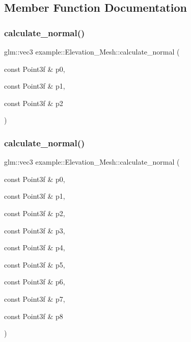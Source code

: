 \subsection{Member Function Documentation}
\mbox{\label{classexample_1_1_elevation___mesh_a3a4637a65ae4c1a7d0f051d26b1f78d8}} 
\subsubsection{\texorpdfstring{calculate\+\_\+normal()}{calculate\_normal()}\hspace{0.1cm}{\footnotesize\ttfamily [1/2]}}
{\footnotesize\ttfamily glm\+::vec3 example\+::\+Elevation\+\_\+\+Mesh\+::calculate\+\_\+normal (\begin{DoxyParamCaption}\item[{const Point3f \&}]{p0,  }\item[{const Point3f \&}]{p1,  }\item[{const Point3f \&}]{p2 }\end{DoxyParamCaption})}

\mbox{\label{classexample_1_1_elevation___mesh_aee6583fd55f431f0a6b8dc8e99b6db94}} 
\subsubsection{\texorpdfstring{calculate\+\_\+normal()}{calculate\_normal()}\hspace{0.1cm}{\footnotesize\ttfamily [2/2]}}
{\footnotesize\ttfamily glm\+::vec3 example\+::\+Elevation\+\_\+\+Mesh\+::calculate\+\_\+normal (\begin{DoxyParamCaption}\item[{const Point3f \&}]{p0,  }\item[{const Point3f \&}]{p1,  }\item[{const Point3f \&}]{p2,  }\item[{const Point3f \&}]{p3,  }\item[{const Point3f \&}]{p4,  }\item[{const Point3f \&}]{p5,  }\item[{const Point3f \&}]{p6,  }\item[{const Point3f \&}]{p7,  }\item[{const Point3f \&}]{p8 }\end{DoxyParamCaption})}

